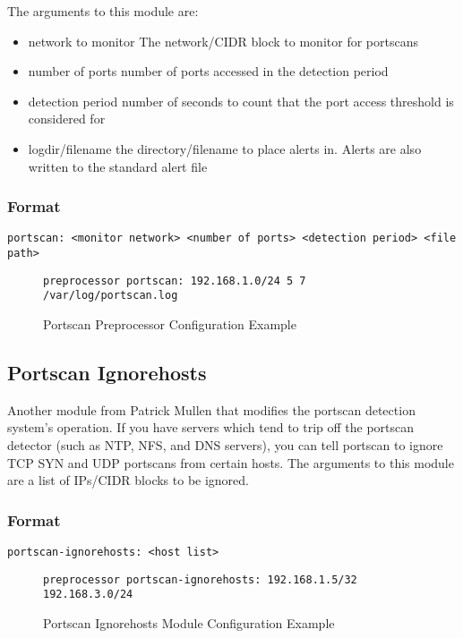 \documentclass[english]{report}
\begin{document}
The arguments to this module are: 

\begin{itemize}
\item network to monitor The network/CIDR block to monitor for portscans 
\item number of ports number of ports accessed in the detection period 
\item detection period number of seconds to count that the port access threshold
is considered for 
\item logdir/filename the directory/filename to place alerts in. Alerts
are also written to the standard alert file
\end{itemize}

\subsubsection{Format}

\begin{verbatim}
portscan: <monitor network> <number of ports> <detection period> <file path>
\end{verbatim}
%
\begin{figure}[!hbpt]
\begin{verbatim}
preprocessor portscan: 192.168.1.0/24 5 7 /var/log/portscan.log
\end{verbatim}

\caption{\label{portscan processor config}Portscan Preprocessor Configuration
Example}
\end{figure}



\subsection{Portscan Ignorehosts}

Another module from Patrick Mullen that modifies the portscan detection
system's operation. If you have servers which tend to trip off the
portscan detector (such as NTP, NFS, and DNS servers), you can tell
portscan to ignore TCP SYN and UDP portscans from certain hosts. The
arguments to this module are a list of IPs/CIDR blocks to be ignored.


\subsubsection{Format}

\begin{verbatim}
portscan-ignorehosts: <host list>
\end{verbatim}
%
\begin{figure}[!hbpt]
\begin{verbatim}
preprocessor portscan-ignorehosts: 192.168.1.5/32 192.168.3.0/24
\end{verbatim}

\caption{\label{portscan ignore hosts example}Portscan Ignorehosts Module
Configuration Example}
\end{figure}
\end{document}
